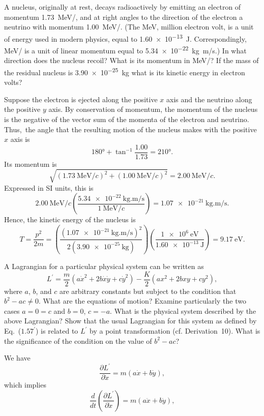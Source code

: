 \begin{questions}
\question
A nucleus, originally at rest, decays radioactively by emitting an electron of momentum \SI{1.73}{\MeV/}, and at right angles to the direction of the electron a neutrino with momentum \SI{1.00}{\MeV/}. (The \si{\MeV}, million electron volt, is a unit of energy used in modern physics, equal to \SI{1.60e-13}{\J}. Correspondingly, \si{\MeV/} is a unit of linear momentum equal to \SI{5.34e-22}{\kg . \m / \s}.) In what direction does the nucleus recoil? What is its momentum in \si{\MeV/}? If the mass of the residual nucleus is \SI{3.90e-25}{\kg} what is its kinetic energy in electron volts?
\begin{solution}
Suppose the electron is ejected along the positive $x$ axis and the neutrino along the positive $y$ axis. By conservation of momentum, the momentum of the nucleus is the negative of the vector sum of the momenta of the electron and neutrino. Thus, the angle that the resulting motion of the nucleus makes with the positive $x$ axis is
\[
\ang{180} + \tan^{-1} \frac{1.00}{1.73} = \ang{210}.
\]
Its momentum is
\[
\sqrt{( \SI{1.73}{\MeV/\mathit{c}} )^2 + ( \SI{1.00}{\MeV/\mathit{c}} )^2} = \SI{2.00}{\MeV/\mathit{c}}.
\]
Expressed in SI units, this is
\[
\SI{2.00}{\MeV/\mathit{c}} \left( \frac{\SI{5.34e-22}{\kg . \m / \s}}{\SI{1}{\MeV/\mathit{c}}} \right) = \SI{1.07e-21}{\kg . \m / \s}.
\]
Hence, the kinetic energy of the nucleus is
\[
T = \frac{p^2}{2 m} = \left( \frac{( \SI{1.07e-21}{\kg . \m / \s} )^2}{ 2 ( \SI{3.90e-25}{\kg} )} \right) \left( \frac{\SI{1e6}{\eV}}{\SI{1.60e-13}{\J}} \right) = \SI{9.17}{\eV}.
\]
\end{solution}
\question
A Lagrangian for a particular physical system can be written as
\[
L^\prime = \frac{m}{2} ( a \dot{x}^2 + 2 b \dot{x} \dot{y} + c \dot{y}^2 ) - \frac{K}{2} ( a x^2 + 2 b x y + c y^2 ),
\]
where $a$, $b$, and $c$ are arbitrary constants but subject to the condition that $b^2 - a c \neq 0$. What are the equations of motion? Examine particularly the two cases $a = 0 = c$ and $b = 0$, $c = -a$. What is the physical system described by the above Lagrangian? Show that the usual Lagrangian for this system as defined by Eq.~($1.57^\prime$) is related to $L^\prime$ by a point transformation (cf. Derivation~10). What is the significance of the condition on the value of $b^2 - a c$?
\begin{solution}
We have
\[
\frac{\partial L^\prime}{\partial \dot{x}} = m ( a \dot{x} + b \dot{y} ),
\]
which implies
\[
\frac{d}{dt} \left( \frac{\partial L^\prime}{\partial \dot{x}} \right) = m ( a \ddot{x} + b \ddot{y} ),
\]
\end{solution}
\end{questions}
